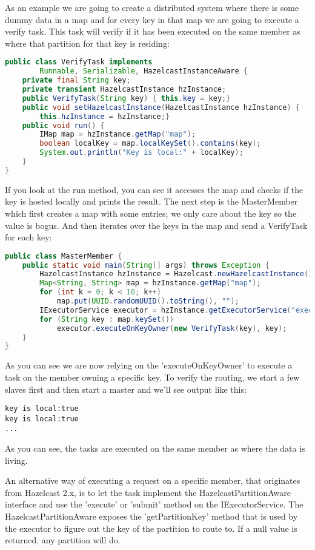 As an example we are going to create a distributed system where there is some dummy data in a map and for every key in that map we are going to execute a verify task. This task will verify if it has been executed on the same member as where that partition for that key is residing:
\begin{lstlisting}[language=java]
public class VerifyTask implements
        Runnable, Serializable, HazelcastInstanceAware {
    private final String key;
    private transient HazelcastInstance hzInstance;
    public VerifyTask(String key) { this.key = key;}
    public void setHazelcastInstance(HazelcastInstance hzInstance) {
        this.hzInstance = hzInstance;}
    public void run() {
        IMap map = hzInstance.getMap("map");
        boolean localKey = map.localKeySet().contains(key);
        System.out.println("Key is local:" + localKey);
    }
}
\end{lstlisting}
If you look at the run method, you can see it accesses the map and checks if the key is hosted locally and prints the result. The next step is the MasterMember which first creates a map with some entries; we only care about the key so the value is bogus. And then iterates over the keys in the map and send a VerifyTask for each key:
\begin{lstlisting}[language=java]
public class MasterMember {
    public static void main(String[] args) throws Exception {
        HazelcastInstance hzInstance = Hazelcast.newHazelcastInstance();
        Map<String, String> map = hzInstance.getMap("map");
        for (int k = 0; k < 10; k++)
            map.put(UUID.randomUUID().toString(), "");
        IExecutorService executor = hzInstance.getExecutorService("executor");
        for (String key : map.keySet())
            executor.executeOnKeyOwner(new VerifyTask(key), key);
    }
}
\end{lstlisting}
As you can see we are now relying on the 'executeOnKeyOwner' to execute a task on the member owning a specific key. To verify the routing, we start a few slaves first and then start a master and we'll see output like this:
\begin{lstlisting}
key is local:true
key is local:true
...
\end{lstlisting}
As you can see, the tasks are executed on the same member as where the data is living.

An alternative way of executing a request on a specific member, that originates from Hazelcast 2.x, is to let the task implement the HazelcastPartitionAware interface and use the  'execute' or 'submit' method on the IExecutorService. The HazelcastPartitionAware exposes the 'getPartitionKey' method that is used by the executor to figure out the key of the partition to route to. If a null value is returned, any partition will do.

